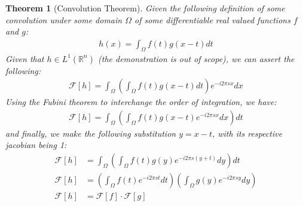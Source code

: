 \documentclass[12pt]{article}
\newtheorem{theorem}{Theorem}
\begin{document}
\begin{theorem} [Convolution Theorem]
    Given the following definition of some convolution under some domain $\Omega$ of some differentiable real valued functions $f$ and $g$:
    \begin{align*}
        h(x) = \int_{\Omega} f(t) g(x - t) dt
    \end{align*}
Given that $h \in L^1\left( \mathbb{R}^n\right)$ (the demonstration is out of scope), we can assert the following:
\begin{align*}
    \mathcal{F}[h] = \int_{\Omega} \left(\int_{\Omega} f(t) g(x - t) dt \right)e^{-i 2 \pi s x} dx
\end{align*}
Using the Fubini theorem to interchange the order of integration, we have:
\begin{align*}
    \mathcal{F}[h] = \int_{\Omega} \left(\int_{\Omega} f(t) g(x - t) e^{-i 2 \pi s x} dx\right) dt
\end{align*}
and finally, we make the following substitution $y = x - t$, with its respective jacobian being 1:
\begin{align*}
    \mathcal{F}[h] &= \int_{\Omega} \left(\int_{\Omega} f(t) g(y) e^{-i 2 \pi s (y + t)} dy\right) dt \\
    \mathcal{F}[h] &= \left(\int_{\Omega} f(t) e^{-i 2 \pi s t} dt \right) \left(\int_{\Omega} g(y) e^{-i 2 \pi s y} dy \right) \\
    \mathcal{F}[h] &= \mathcal{F}[f] \cdot \mathcal{F}[g]
\end{align*}
\end{theorem}
\end{document}
